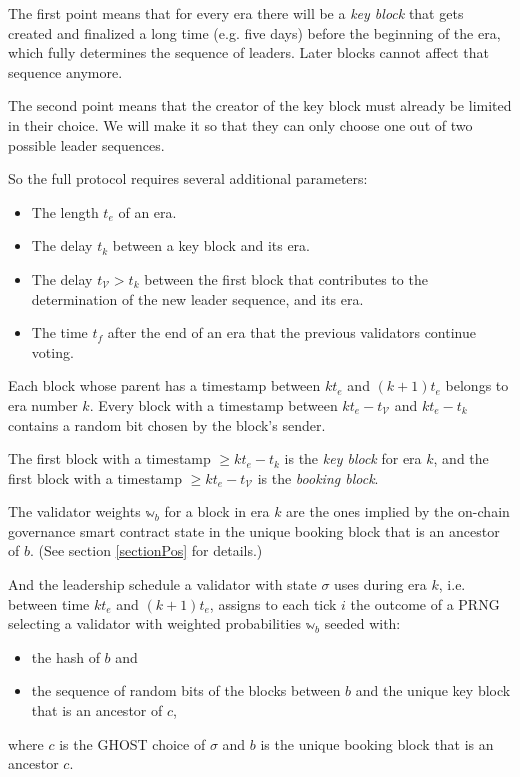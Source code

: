 \documentclass[12pt, fleqn]{article}
\newcommand{\ww}{\mathbb{w}}
\begin{document}
The first point means that for every era there will be a \emph{key block} that gets created and finalized a long time (e.g. five days) before the beginning of the era, which fully determines the sequence of leaders. Later blocks cannot affect that sequence anymore.

The second point means that the creator of the key block must already be limited in their choice. We will make it so that they can only choose one out of two possible leader sequences.

So the full protocol requires several additional parameters:
\begin{itemize}
  \item The length $t_e$ of an era.
  \item The delay $t_k$ between a key block and its era.
  \item The delay $t_{\mathcal{V}} > t_k$ between the first block that contributes to the determination of the new leader sequence, and its era.
  \item The time $t_f$ after the end of an era that the previous validators continue voting.
\end{itemize}

Each block whose parent has a timestamp between $k t_e$ and $(k + 1) t_e$ belongs to era number $k$.
Every block with a timestamp between $k t_e - t_{\mathcal{V}}$ and $k t_e - t_k$ contains a random bit chosen by the block's sender.

The first block with a timestamp $\geq k t_e - t_k$ is the \emph{key block} for era $k$, and the first block with a timestamp $\geq k t_e - t_{\mathcal{V}}$ is the \emph{booking block}.

The validator weights $\ww_b$ for a block in era $k$ are the ones implied by the on-chain governance smart contract state in the unique booking block that is an ancestor of $b$. (See section \ref{sectionPos} for details.)

And the leadership schedule a validator with state $\sigma$ uses during era $k$, i.e. between time $k t_e$ and $(k + 1) t_e$, assigns to each tick $i$ the outcome of a PRNG selecting a validator with weighted probabilities $\ww_b$ seeded with:
\begin{itemize}
  \item the hash of $b$ and
  \item the sequence of random bits of the blocks between $b$ and the unique key block that is an ancestor of $c$,
\end{itemize}
where $c$ is the GHOST choice of $\sigma$ and $b$ is the unique booking block that is an ancestor $c$.
\end{document}
